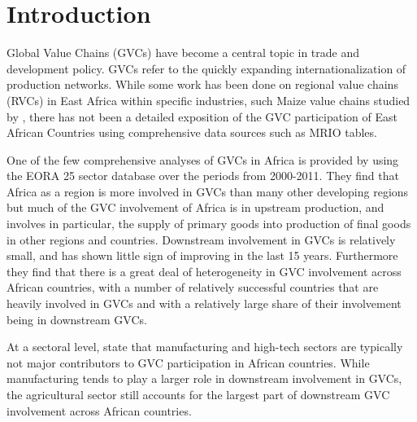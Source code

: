 \documentclass[a4paper]{article}
\begin{document}
\newpage
\tableofcontents
\newpage
\listoftables
\listoffigures
\newpage

\section{Introduction}

Global Value Chains (GVCs) have become a central topic in trade and development policy. GVCs refer to the quickly expanding internationalization of production networks. While some work has been done on regional value chains (RVCs) in East Africa within specific industries, such Maize value chains studied by \citet{daly2016maize}, there has not been a detailed exposition of the GVC participation of East African Countries using comprehensive data sources such as MRIO tables. \newline

One of the few comprehensive analyses of GVCs in Africa is provided by \citet{foster2015global} using the EORA 25 sector database over the periods from 2000-2011. %
They find that Africa as a region is more involved in GVCs than many other developing regions but much of the GVC involvement of Africa is in upstream production, and involves in particular, the supply of primary goods into production of final goods in other regions and countries. Downstream involvement in GVCs is relatively small, and has shown little sign of improving in the last 15 years. Furthermore they find that there is a great deal of heterogeneity in GVC involvement across African countries, with a number of relatively successful countries that are heavily involved in GVCs and with a relatively large share of their involvement being in downstream GVCs. \newline

At a sectoral level, \citet{foster2015global} state that manufacturing and high-tech sectors are typically not major contributors to GVC participation in African countries. While manufacturing tends to play a larger role in downstream involvement in GVCs, the agricultural sector still accounts for the largest part of downstream GVC involvement across African countries. \newline %
\end{document}

